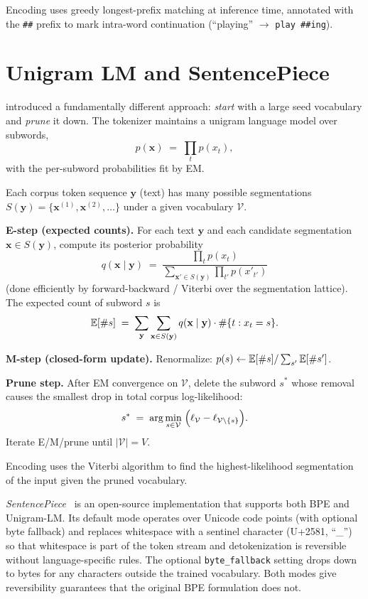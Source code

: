 Encoding uses greedy longest-prefix matching at inference time,
annotated with the \texttt{\#\#} prefix to mark intra-word
continuation (``playing'' $\to$ \texttt{play \#\#ing}).

\section{Unigram LM and SentencePiece}

\citet{kudo2018unigram} introduced a fundamentally different approach:
\emph{start} with a large seed vocabulary and \emph{prune} it down. The
tokenizer maintains a unigram language model over subwords,
\begin{equation}
\label{eq:ch4-unigram}
p(\mathbf{x}) \;=\; \prod_{t} p(x_t),
\end{equation}
with the per-subword probabilities fit by EM.

\begin{derivation}
Each corpus token sequence $\mathbf{y}$ (text) has many possible
segmentations $S(\mathbf{y}) = \{\mathbf{x}^{(1)}, \mathbf{x}^{(2)},
\dots\}$ under a given vocabulary $\mathcal{V}$.

\textbf{E-step (expected counts).} For each text $\mathbf{y}$ and
each candidate segmentation $\mathbf{x} \in S(\mathbf{y})$, compute
its posterior probability
\[
  q(\mathbf{x} \mid \mathbf{y}) \;=\;
  \frac{\prod_t p(x_t)}{\sum_{\mathbf{x}' \in S(\mathbf{y})}
    \prod_{t'} p(x'_{t'})}
\]
(done efficiently by forward-backward / Viterbi over the
segmentation lattice). The expected count of subword $s$ is
\[
  \mathbb{E}[\#s] \;=\; \sum_{\mathbf{y}} \sum_{\mathbf{x} \in S(\mathbf{y})}
    q(\mathbf{x}\mid\mathbf{y}) \cdot \#\{t : x_t = s\}.
\]

\textbf{M-step (closed-form update).} Renormalize:
$p(s) \leftarrow \mathbb{E}[\#s] / \sum_{s'} \mathbb{E}[\#s']$.

\textbf{Prune step.} After EM convergence on $\mathcal{V}$, delete
the subword $s^*$ whose removal causes the smallest drop in total
corpus log-likelihood:
\[
  s^* \;=\; \arg\min_{s \in \mathcal{V}}\;
    \Bigl(\ell_{\mathcal{V}} - \ell_{\mathcal{V}\setminus\{s\}}\Bigr).
\]
Iterate E/M/prune until $|\mathcal{V}| = V$.
\end{derivation}

Encoding uses the Viterbi algorithm to find the highest-likelihood
segmentation of the input given the pruned vocabulary.

\emph{SentencePiece}~\citep{kudo2018sentencepiece} is an open-source
implementation that supports both BPE and Unigram-LM. Its default
mode operates over Unicode code points (with optional byte
fallback) and replaces whitespace with a sentinel character (U+2581,
``\_'') so that whitespace is part of the token stream and
detokenization is reversible without language-specific rules. The
optional \texttt{byte\_fallback} setting drops down to bytes for any
characters outside the trained vocabulary. Both modes give
reversibility guarantees that the original BPE formulation does not.

